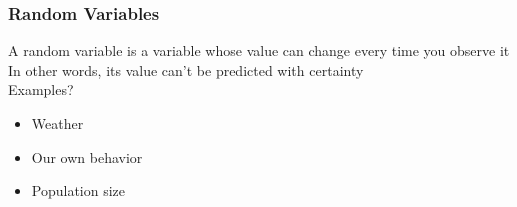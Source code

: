 \documentclass[color=usenames,dvipsnames]{beamer}\usepackage[]{graphicx}\usepackage[]{color}
\begin{document}
\begin{frame}
  \frametitle{Random Variables}
  \large
    A random variable is a variable whose value can change every time
      you observe it \\
    \vfill
    In other words, its value can't be predicted with certainty \\
    \pause
    \vfill
    Examples?
    \begin{itemize}
      \item Weather
      \item Our own behavior
      \item Population size
    \end{itemize}
\end{frame}






\end{document}
